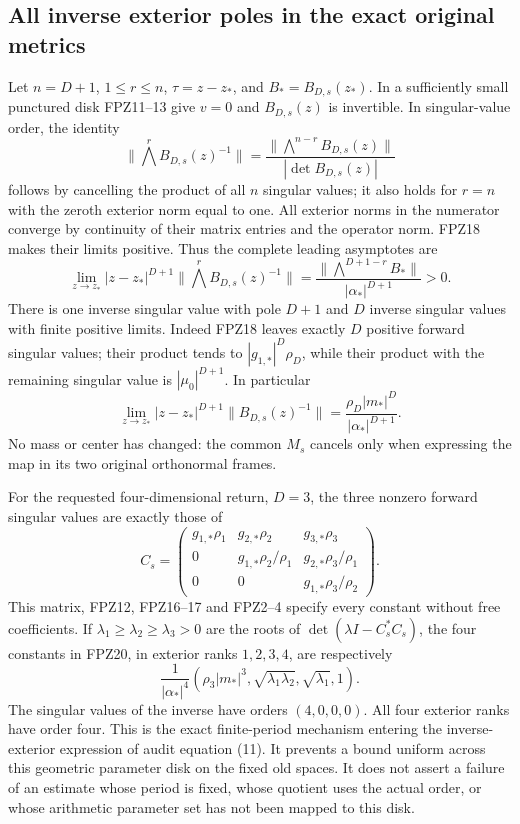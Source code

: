\subsection{All inverse exterior poles in the exact original metrics}
Let $n=D+1$, $1\le r\le n$, $\tau=z-z_*$, and
$B_*=B_{D,s}(z_*)$. In a sufficiently small punctured disk FPZ11--13
give $v=0$ and $B_{D,s}(z)$ is invertible. In singular-value order,
the identity
\[
 \|\bigwedge^r B_{D,s}(z)^{-1}\|
 =\frac{\|\bigwedge^{n-r}B_{D,s}(z)\|}
 {|\det B_{D,s}(z)|}
 \tag{FPZ19}
\]
follows by cancelling the product of all $n$ singular values; it also
holds for $r=n$ with the zeroth exterior norm equal to one.
All exterior norms in the numerator converge by continuity of their
matrix entries and the operator norm. FPZ18 makes their limits positive.
Thus the complete leading asymptotes are
\[
 \boxed{\displaystyle
 \lim_{z\to z_*}|z-z_*|^{D+1}
 \|\bigwedge^r B_{D,s}(z)^{-1}\|
 =\frac{\|\bigwedge^{D+1-r}B_*\|}{|\alpha_*|^{D+1}}>0.}
 \tag{FPZ20}
\]
There is one inverse singular value with pole $D+1$ and $D$ inverse
singular values with finite positive limits. Indeed FPZ18 leaves exactly
$D$ positive forward singular values; their product tends to
$|g_{1,*}|^D\rho_D$, while their product with the remaining singular
value is $|\mu_0|^{D+1}$. In particular
\[
 \lim_{z\to z_*}|z-z_*|^{D+1}\|B_{D,s}(z)^{-1}\|
 =\frac{\rho_D|m_*|^D}{|\alpha_*|^{D+1}}.
 \tag{FPZ21}
\]
No mass or center has changed: the common $M_s$ cancels only when
expressing the map in its two original orthonormal frames.

For the requested four-dimensional return, $D=3$, the three nonzero
forward singular values are exactly those of
\[
 C_s=\begin{pmatrix}
 g_{1,*}\rho_1&g_{2,*}\rho_2&g_{3,*}\rho_3\\
 0&g_{1,*}\rho_2/\rho_1&g_{2,*}\rho_3/\rho_1\\
 0&0&g_{1,*}\rho_3/\rho_2
 \end{pmatrix}.
 \tag{FPZ22}
\]
This matrix, FPZ12, FPZ16--17 and FPZ2--4 specify every constant
without free coefficients. If $\lambda_1\ge\lambda_2\ge\lambda_3>0$
are the roots of $\det(\lambda I-C_s^*C_s)$, the four constants in
FPZ20, in exterior ranks $1,2,3,4$, are respectively
\[
 \frac1{|\alpha_*|^4}
 \left(\rho_3|m_*|^3,\sqrt{\lambda_1\lambda_2},
                           \sqrt{\lambda_1},1\right).
 \tag{FPZ23}
\]
The singular values of the inverse have orders $(4,0,0,0)$.
All four exterior ranks have order four. This is the exact finite-period
mechanism entering the inverse-exterior expression of audit equation
(11). It prevents a bound uniform across this geometric parameter
disk on the fixed old spaces. It does not assert a failure of an estimate
whose period is fixed, whose quotient uses the actual order, or whose
arithmetic parameter set has not been mapped to this disk.

